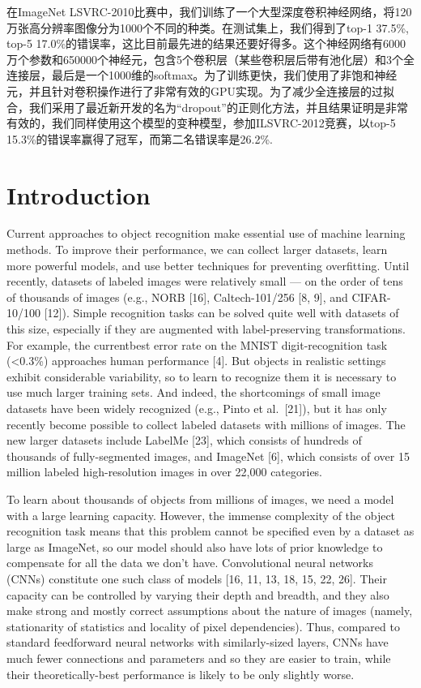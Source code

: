 \documentclass[12pt,a4paper,UTF8,twoside]{book}
\begin{document}
在ImageNet LSVRC-2010比赛中，我们训练了一个大型深度卷积神经网络，将120万张高分辨率图像分为1000个不同的种类。在测试集上，我们得到了top-1 37.5\%, top-5 17.0\%的错误率，这比目前最先进的结果还要好得多。这个神经网络有6000万个参数和650000个神经元，包含5个卷积层（某些卷积层后带有池化层）和3个全连接层，最后是一个1000维的softmax。为了训练更快，我们使用了非饱和神经元，并且针对卷积操作进行了非常有效的GPU实现。为了减少全连接层的过拟合，我们采用了最近新开发的名为``dropout''的正则化方法，并且结果证明是非常有效的，我们同样使用这个模型的变种模型，参加ILSVRC-2012竞赛，以top-5 15.3\%的错误率赢得了冠军，而第二名错误率是26.2\%.

\hypertarget{introduction}{%
\section{Introduction}\label{introduction}}

Current approaches to object recognition make essential use of machine learning methods. To improve their performance, we can collect larger datasets, learn more powerful models, and use better techniques for preventing overfitting. Until recently, datasets of labeled images were relatively small --- on the order of tens of thousands of images (e.g., NORB {[}16{]}, Caltech-101/256 {[}8, 9{]}, and CIFAR-10/100 {[}12{]}). Simple recognition tasks can be solved quite well with datasets of this size, especially if they are augmented with label-preserving transformations. For example, the currentbest error rate on the MNIST digit-recognition task (\textless0.3\%) approaches human performance {[}4{]}. But objects in realistic settings exhibit considerable variability, so to learn to recognize them it is necessary to use much larger training sets. And indeed, the shortcomings of small image datasets have been widely recognized (e.g., Pinto et al.~{[}21{]}), but it has only recently become possible to collect labeled datasets with millions of images. The new larger datasets include LabelMe {[}23{]}, which consists of hundreds of thousands of fully-segmented images, and ImageNet {[}6{]}, which consists of over 15 million labeled high-resolution images in over 22,000 categories.

To learn about thousands of objects from millions of images, we need a model with a large learning capacity. However, the immense complexity of the object recognition task means that this problem cannot be specified even by a dataset as large as ImageNet, so our model should also have lots of prior knowledge to compensate for all the data we don't have. Convolutional neural networks (CNNs) constitute one such class of models {[}16, 11, 13, 18, 15, 22, 26{]}. Their capacity can be controlled by varying their depth and breadth, and they also make strong and mostly correct assumptions about the nature of images (namely, stationarity of statistics and locality of pixel dependencies). Thus, compared to standard feedforward neural networks with similarly-sized layers, CNNs have much fewer connections and parameters and so they are easier to train, while their theoretically-best performance is likely to be only slightly worse.
\end{document}
